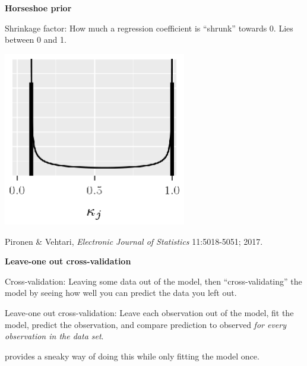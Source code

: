 \documentclass[titlepage,landscape,pdftex]{seminar}
\newcommand{\heading}[1]{{\color{red}\large\bf#1}}
\begin{document}
\begin{slide}
  \heading{Horseshoe prior}

  \noindent Shrinkage factor: How much a regression coefficient is
  ``shrunk'' towards 0. Lies between 0 and 1.

  \begin{center}
    \includegraphics[width=0.6\textwidth]{horseshoe-prior.eps}
  \end{center}

  Pironen \& Vehtari, {\it Electronic Journal of Statistics}
  11:5018-5051; 2017.

\end{slide}

\begin{slide}
  \heading{Leave-one out cross-validation}

  \noindent Cross-validation: Leaving some data out of the model, then
  ``cross-validating'' the model by seeing how well you can predict
  the data you left out.

  \noindent Leave-one out cross-validation: Leave each observation out
  of the model, fit the model, predict the observation, and compare
  prediction to observed {\it for every observation in the data set}.

   provides a sneaky way of doing this while only
  fitting the model once.

\end{slide}
\end{document}
